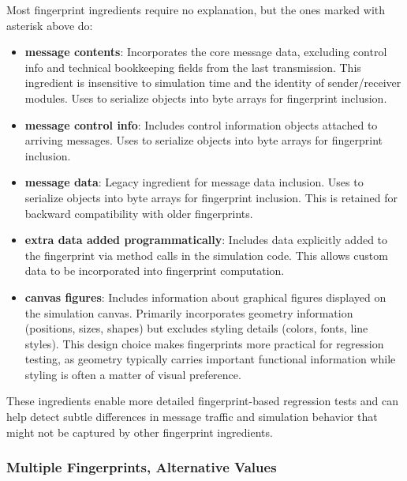 Most fingerprint ingredients require no explanation, but the ones marked with
asterisk above do:

\begin{itemize}
  \item[\tbf{b}] \textbf{message contents}: Incorporates the core message data,
    excluding control info and technical bookkeeping fields from the last
    transmission. This ingredient is insensitive to simulation time and the
    identity of sender/receiver modules. Uses  to serialize
    objects into byte arrays for fingerprint inclusion.

  \item[\tbf{g}] \textbf{message control info}: Includes control information
    objects attached to arriving messages. Uses  to serialize
    objects into byte arrays for fingerprint inclusion.

  \item[\tbf{d}] \textbf{message data}: Legacy ingredient for message data
    inclusion. Uses  to serialize objects into byte arrays
    for fingerprint inclusion. This is retained for backward compatibility with
    older fingerprints.

  \item[\tbf{x}] \textbf{extra data added programmatically}: Includes data
    explicitly added to the fingerprint via  method calls in
    the simulation code. This allows custom data to be incorporated into
    fingerprint computation.

  \item[\tbf{f}] \textbf{canvas figures}: Includes information about graphical
    figures displayed on the simulation canvas. Primarily incorporates geometry
    information (positions, sizes, shapes) but excludes styling details (colors,
    fonts, line styles). This design choice makes fingerprints more practical for
    regression testing, as geometry typically carries important functional
    information while styling is often a matter of visual preference.
\end{itemize}

These ingredients enable more detailed fingerprint-based regression tests and can help detect subtle differences in message traffic and simulation behavior that might not be captured by other fingerprint ingredients.


\subsubsection{Multiple Fingerprints, Alternative Values}
\label{sec:testing:multiple-fingerprints-alternative-values}

